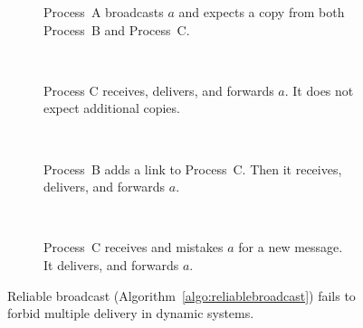 

\begin{figure}
  \begin{center}
    \begin{subfigure}[t]{0.23\textwidth}
      \centering%
      \caption{\label{fig:memorylinkfailsA}Process~A broadcasts $a$ and expects a copy
        from both Process~B and Process~C.}
    \end{subfigure}
    ~
    \begin{subfigure}[t]{0.23\textwidth}
      \centering%
      \caption{\label{fig:memorylinkfailsB}Process C receives, delivers, and
        forwards $a$. It does not expect additional copies.}
    \end{subfigure}
    ~
    \begin{subfigure}[t]{0.23\textwidth}
      \centering%
      \caption{\label{fig:memorylinkfailsC}Process~B adds a link to Process~C. 
        Then it receives, delivers, and forwards $a$.}
    \end{subfigure}
    ~
    \begin{subfigure}[t]{0.23\textwidth}
      \centering%
      \caption{\label{fig:memorylinkfailsD}Process~C receives and mistakes $a$
        for a new message. It delivers, and forwards $a$.}
    \end{subfigure}
    \caption{\label{fig:memoryfails}Reliable broadcast
      (Algorithm~\ref{algo:reliablebroadcast}) fails to forbid multiple delivery
      in dynamic systems. }
  \end{center}
\end{figure}


